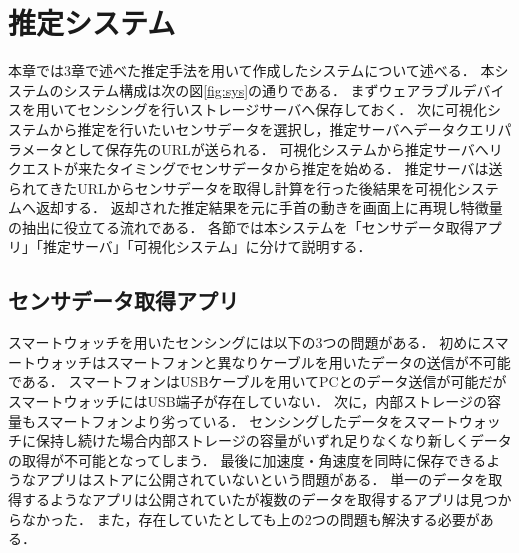 \chapter{推定システム}
本章では3章で述べた推定手法を用いて作成したシステムについて述べる．
本システムのシステム構成は次の図\ref{fig:sys}の通りである．
まずウェアラブルデバイスを用いてセンシングを行いストレージサーバへ保存しておく．
次に可視化システムから推定を行いたいセンサデータを選択し，推定サーバへデータクエリパラメータとして保存先のURLが送られる．
可視化システムから推定サーバへリクエストが来たタイミングでセンサデータから推定を始める．
推定サーバは送られてきたURLからセンサデータを取得し計算を行った後結果を可視化システムへ返却する．
返却された推定結果を元に手首の動きを画面上に再現し特徴量の抽出に役立てる流れである．
各節では本システムを「センサデータ取得アプリ」「推定サーバ」「可視化システム」に分けて説明する．
\section{センサデータ取得アプリ}
スマートウォッチを用いたセンシングには以下の3つの問題がある．
初めにスマートウォッチはスマートフォンと異なりケーブルを用いたデータの送信が不可能である．
スマートフォンはUSBケーブルを用いてPCとのデータ送信が可能だがスマートウォッチにはUSB端子が存在していない．
次に，内部ストレージの容量もスマートフォンより劣っている．
センシングしたデータをスマートウォッチに保持し続けた場合内部ストレージの容量がいずれ足りなくなり新しくデータの取得が不可能となってしまう．
最後に加速度・角速度を同時に保存できるようなアプリはストアに公開されていないという問題がある．
単一のデータを取得するようなアプリは公開されていたが複数のデータを取得するアプリは見つからなかった．
また，存在していたとしても上の2つの問題も解決する必要がある．


